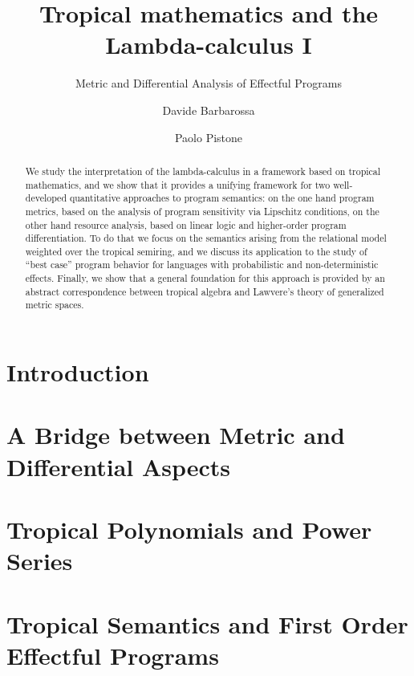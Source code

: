 \documentclass[a4paper,english, UKenglish,cleveref, autoref, thm-restate]{lipics-v2021}
\title{Tropical mathematics and the Lambda-calculus I}
\subtitle{Metric and Differential Analysis of Effectful Programs
} %
\author{Davide {Barbarossa}}{Dipartimento di Informatica - Scienza e Ingegneria, Universit\`a di Bologna, %
Italy%
\and \url{https://lipn.univ-paris13.fr/\~barbarossa/index.html} }{davide.barbarossa@unibo.it}{https://orcid.org/0000-0003-4608-8282}{%
}%
\author{Paolo {Pistone}}{Dipartimento di Informatica - Scienza e Ingegneria, Universit\`a di Bologna, %
Italy%
\and \url{http://logica.uniroma3.it/pistone/
} }{paolo.pistone2@unibo.it}{https://orcid.org/0000-0003-4250-9051}{%
}
\begin{document}
\maketitle

\begin{abstract}
We study the interpretation of the lambda-calculus in a framework based on tropical mathematics, and we show that it provides a unifying framework for two well-developed quantitative approaches to program semantics: on the one hand program metrics, based on the analysis of program sensitivity via Lipschitz conditions, on the other hand resource analysis, based on linear logic and higher-order program differentiation. 
To do that we focus on the semantics arising from the relational model weighted over the tropical semiring, and we discuss its application to the study of “best case” program behavior for languages with probabilistic and non-deterministic effects. Finally, we show that a general foundation for this approach is provided by an abstract correspondence between tropical algebra and Lawvere’s theory of generalized metric spaces.
\end{abstract}

\section{Introduction}



\section{A Bridge between Metric and Differential Aspects}\label{section5bis}



\section{Tropical Polynomials and Power Series}\label{section2}


\section{Tropical Semantics and First Order Effectful Programs}\label{section22}

\end{document}
